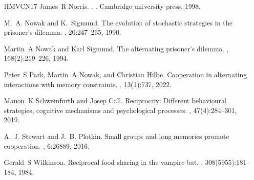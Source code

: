 \documentclass{article}
\theoremstyle{definition}
\numberwithin{equation}{section}
\begin{document}
\begin{thebibliography}{HMVCN17}
James~R Norris.
.
. Cambridge university press, 1998.

M.~A. Nowak and K.~Sigmund.
\newblock The evolution of stochastic strategies in the prisoner's dilemma.
, 20:247--265, 1990.

Martin~A Nowak and Karl Sigmund.
\newblock The alternating prisoner's dilemma.
, 168(2):219--226, 1994.

Peter~S Park, Martin~A Nowak, and Christian Hilbe.
\newblock Cooperation in alternating interactions with memory constraints.
, 13(1):737, 2022.

Manon~K Schweinfurth and Josep Call.
\newblock Reciprocity: Different behavioural strategies, cognitive mechanisms and psychological processes.
, 47(4):284--301, 2019.

A.~J. Stewart and J.~B. Plotkin.
\newblock Small groups and long memories promote cooperation.
, 6:26889, 2016.

Gerald~S Wilkinson.
\newblock Reciprocal food sharing in the vampire bat.
, 308(5955):181--184, 1984.

\end{thebibliography}
\end{document}
